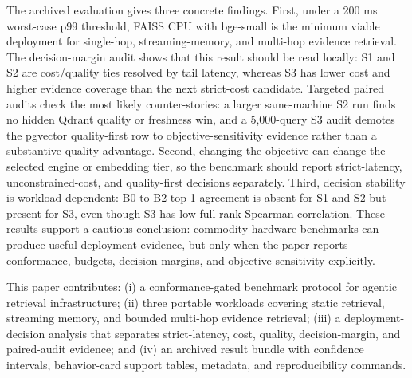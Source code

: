 The archived evaluation gives three concrete findings. First, under a 200 ms worst-case p99 threshold, FAISS CPU with bge-small is the minimum viable deployment for single-hop, streaming-memory, and multi-hop evidence retrieval. The decision-margin audit shows that this result should be read locally: S1 and S2 are cost/quality ties resolved by tail latency, whereas S3 has lower cost and higher evidence coverage than the next strict-cost candidate. Targeted paired audits check the most likely counter-stories: a larger same-machine S2 run finds no hidden Qdrant quality or freshness win, and a 5{,}000-query S3 audit demotes the pgvector quality-first row to objective-sensitivity evidence rather than a substantive quality advantage. Second, changing the objective can change the selected engine or embedding tier, so the benchmark should report strict-latency, unconstrained-cost, and quality-first decisions separately. Third, decision stability is workload-dependent: B0-to-B2 top-1 agreement is absent for S1 and S2 but present for S3, even though S3 has low full-rank Spearman correlation. These results support a cautious conclusion: commodity-hardware benchmarks can produce useful deployment evidence, but only when the paper reports conformance, budgets, decision margins, and objective sensitivity explicitly.

This paper contributes: (i) a conformance-gated benchmark protocol for agentic retrieval infrastructure; (ii) three portable workloads covering static retrieval, streaming memory, and bounded multi-hop evidence retrieval; (iii) a deployment-decision analysis that separates strict-latency, cost, quality, decision-margin, and paired-audit evidence; and (iv) an archived result bundle with confidence intervals, behavior-card support tables, metadata, and reproducibility commands.
